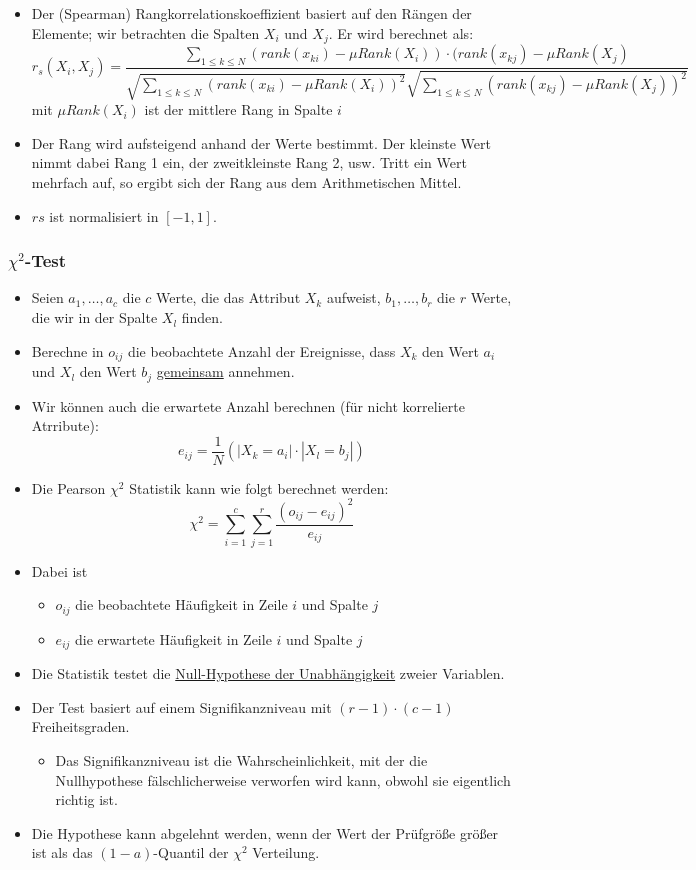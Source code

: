 \documentclass{scrartcl}
\begin{document}
\begin{itemize}
	\item Der (Spearman) Rangkorrelationskoeffizient basiert auf den Rängen der 
	Elemente; wir betrachten die Spalten $ X_i $ und $ X_j $. Er wird berechnet 
	als:
	\[ r_s(X_i,X_j) = \frac{\sum_{1 \leq k \leq N} (rank(x_{ki}) - 
	\mu Rank(X_i)) \cdot (rank(x_{kj}) - \mu Rank(X_j)}{\sqrt{\sum_{1 \leq k 
	\leq N} (rank(x_{ki}) - \mu Rank(X_i))^2} \sqrt{\sum_{1 \leq k \leq N} 
(rank(x_{kj}) - \mu Rank(X_j))^2}} \]
	mit $ \mu Rank(X_i) $ ist der mittlere Rang in Spalte $ i $
	\item Der Rang wird aufsteigend anhand der Werte bestimmt. Der kleinste 
	Wert nimmt dabei Rang 1 ein, der zweitkleinste Rang 2, usw. Tritt ein Wert 
	mehrfach auf, so ergibt sich der Rang aus dem Arithmetischen Mittel.
	\item $ rs $ ist normalisiert in $ [-1,1] $.
\end{itemize}

\subsubsection{$ \chi^2 $-Test}

\begin{itemize}
	\item Seien $ a_1,\ldots,a_c $ die $ c $ Werte, die das Attribut $ X_k $ 
	aufweist, $ b_1,\ldots,b_r $ die $ r $ Werte, die wir in der Spalte $ X_l $ 
	finden.
	\item Berechne in $ o_{ij} $ die beobachtete Anzahl der Ereignisse, dass $ 
	X_k $ den Wert $ a_i $ und $ X_l $ den Wert $ b_j $ \underline{gemeinsam} 
	annehmen.
	\item Wir können auch die erwartete Anzahl berechnen (für nicht korrelierte 
	Atrribute):
	\[ e_{ij} = \frac{1}{N} (|X_k=a_i| \cdot |X_l=b_j|) \]
	\item Die Pearson $ \chi^2 $ Statistik kann wie folgt berechnet werden:
	\[ \chi^2 = \sum_{i=1}^{c} \sum_{j=1}^{r} \frac{(o_{ij} - 
	e_{ij})^2}{e_{ij}} \]
	\item Dabei ist
	\begin{itemize}
		\item $ o_{ij} $ die beobachtete Häufigkeit in Zeile $ i $ und Spalte $ 
		j $
		\item $ e_{ij} $ die erwartete Häufigkeit in Zeile $ i $ und Spalte $ j 
		$
	\end{itemize}
	\item Die Statistik testet die \underline{Null-Hypothese der 
	Unabhängigkeit} zweier Variablen.
	\item Der Test basiert auf einem Signifikanzniveau mit $ (r-1) \cdot (c-1) 
	$ Freiheitsgraden.
	\begin{itemize}
		\item Das Signifikanzniveau ist die Wahrscheinlichkeit, mit der die 
		Nullhypothese fälschlicherweise verworfen wird kann, obwohl sie 
		eigentlich richtig ist.
	\end{itemize}
	\item Die Hypothese kann abgelehnt werden, wenn der Wert der Prüfgröße 
	größer ist als das $ (1-a) $-Quantil der $ \chi^2 $ Verteilung.
\end{itemize}
\end{document}

